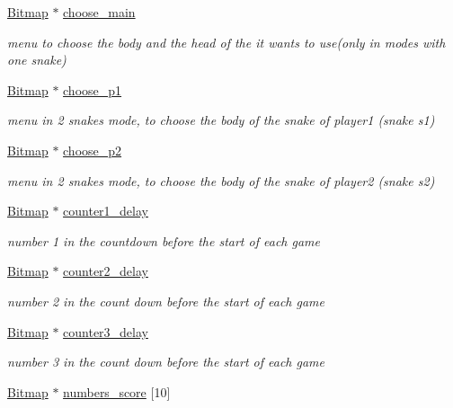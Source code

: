 \begin{DoxyCompactItemize}
\hyperlink{structBitmap}{Bitmap} $\ast$ \hyperlink{group__graphics_ga0fe961b9b328a12b933b0e3d2393e9d4}{choose\+\_\+main}
\begin{DoxyCompactList}\small\item\em menu to choose the body and the head of the it wants to use(only in modes with one snake) \end{DoxyCompactList}\item 
\hyperlink{structBitmap}{Bitmap} $\ast$ \hyperlink{group__graphics_ga1c051bf49f7de6f60eb93649684ebfb5}{choose\+\_\+p1}
\begin{DoxyCompactList}\small\item\em menu in 2 snakes mode, to choose the body of the snake of player1 (snake s1) \end{DoxyCompactList}\item 
\hyperlink{structBitmap}{Bitmap} $\ast$ \hyperlink{group__graphics_gabe0652c58a65bf0ccd93497ab08d9cfb}{choose\+\_\+p2}
\begin{DoxyCompactList}\small\item\em menu in 2 snakes mode, to choose the body of the snake of player2 (snake s2) \end{DoxyCompactList}\item 
\hyperlink{structBitmap}{Bitmap} $\ast$ \hyperlink{group__graphics_ga0d2f0b6ce3ed9e3fbdca9fb0e2197c8f}{counter1\+\_\+delay}
\begin{DoxyCompactList}\small\item\em number 1 in the countdown before the start of each game \end{DoxyCompactList}\item 
\hyperlink{structBitmap}{Bitmap} $\ast$ \hyperlink{group__graphics_gabbfd3197d8f58f68356e4c404c9b41a7}{counter2\+\_\+delay}
\begin{DoxyCompactList}\small\item\em number 2 in the count down before the start of each game \end{DoxyCompactList}\item 
\hyperlink{structBitmap}{Bitmap} $\ast$ \hyperlink{group__graphics_gac1063b5ae836e49a51d16a672c9cc11f}{counter3\+\_\+delay}
\begin{DoxyCompactList}\small\item\em number 3 in the count down before the start of each game \end{DoxyCompactList}\item 
\hyperlink{structBitmap}{Bitmap} $\ast$ \hyperlink{group__graphics_gac29eba55edb941d1896f1ea16ba40601}{numbers\+\_\+score} \mbox{[}10\mbox{]}

\end{DoxyCompactItemize}
